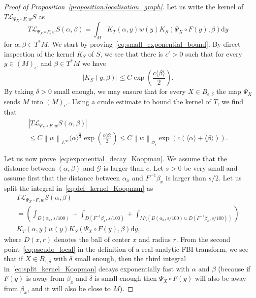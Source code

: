 \documentclass[10pt]{amsart}
\theoremstyle{definition}\newtheorem{defi}[theo]{Definition}\newtheorem{rema}[theo]{Remark}\newtheorem{exam}[theo]{Example}\newtheorem{exem}[theo]{Example}\newtheorem{nota}[theo]{Notation}
\newcommand{\p}[1]{\left(#1\right)}
\newcommand{\n}[1]{\left\|#1\right\|}
\newcommand{\va}[1]{\left|#1\right|}
\newcommand{\brac}[1]{\langle #1 \rangle}
\newcommand{\clO}{\mathcal{O}}
\newcommand{\clL}{\mathcal{L}}
\newcommand{\clG}{\mathcal{G}}
\newcommand{\rmd}{\mathrm{d}}
\begin{document}
\begin{proof}[Proof of Proposition~\ref{proposition:localisation_graph}]
Let us write the kernel of $T\clL_{\Psi_X \circ F, w} S$ as
\begin{equation}\label{eq:def_kernel_Koopman}
T\clL_{\Psi_X \circ F, w} S(\alpha,\beta) = \int_M K_T(\alpha,y) w(y) K_S(\Psi_X \circ F(y),\beta) \rmd y
\end{equation}
for $\alpha,\beta \in T^* M$. We start by proving~\eqref{eq:small_exponential_bound}. By direct inspection of the kernel $K_S$ of $S$, we see that there is $\epsilon' > 0$ such that for every $y \in (M)_{\epsilon'}$ and $\beta \in T^* M$ we have
\begin{equation*}
\va{K_S(y,\beta)} \leq C \exp\p{\frac{c \brac{\beta}}{2}}.
\end{equation*}
By taking $\delta > 0$ small enough, we may ensure that for every $X \in B_{\epsilon,\delta}$ the map $\Psi_X$ sends $M$ into $(M)_{\epsilon'}$. Using a crude estimate to bound the kernel of $T$, we find that
\begin{multline*}
 \va{T\clL_{\Psi_X \circ F, w} S(\alpha,\beta)} \\ 
\leq C \n{w}_{L^\infty} \brac{\alpha}^{\frac{d}{4}} \exp\p{\frac{c \brac{\beta}}{2}} \leq C \n{w}_{\clO_\epsilon} \exp\p{c (\brac{\alpha} + \brac{\beta})}.
\end{multline*}

Let us now prove~\eqref{eq:exponential_decay_Koopman}. We assume that the distance between $(\alpha,\beta)$ and $\clG$ is larger than $c$. Let $s > 0$ be very small and assume first that the distance between $\alpha_x$ and $F^{-1} \beta_x$ is larger than $s/2$. Let us split the integral in~\eqref{eq:def_kernel_Koopman} as
\begin{multline}\label{eq:split_kernel_Koopman}
 T\clL_{\Psi_X \circ F, w} S(\alpha,\beta) \\
= \p{\int_{D(\alpha_x,s/100)} + \int_{D\left(F^{-1} \beta_x,s/100\right)} + \int_{M \setminus \p{D(\alpha_x,s/100) \cup D\left(F^{-1} \beta_x,s/100\right)}}} \\
 K_T(\alpha,y) w(y) K_S(\Psi_X \circ F(y),\beta) \rmd y,
\end{multline}
where $D(x,r)$ denotes the ball of center $x$ and radius $r$. From the second point~\eqref{eq:pseudo_local} in the definition of a real-analytic FBI transform, we see that if $X \in B_{\epsilon,\delta}$ with $\delta$ small enough, then the third integral in~\eqref{eq:split_kernel_Koopman} decays exponentially fast with $\alpha$ and $\beta$ (because if $F(y)$ is away from $\beta_x$ and $\delta$ is small enough then $\Psi_X \circ F(y)$ will also be away from $\beta_x$, and it will also be close to $M$).


\end{proof}
\end{document}
